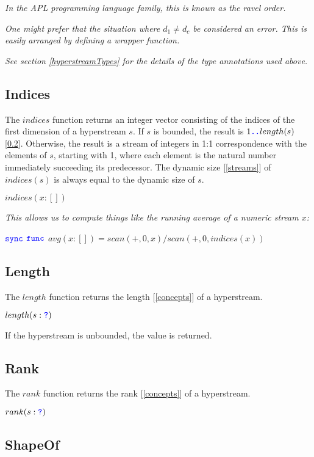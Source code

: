 \documentclass{article}
\begin{document}
{\em In the APL programming language family, this is known as the ravel order.}

{\em
One might prefer that the situation where $d_1 \ne d_c$ be considered an error.  This is easily arranged by defining a wrapper function.
}

{\em
See section \ref{hyperstreamTypes} for the details of the type annotations used above.
}

\subsection{Indices}
\label{indices}

The $indices$ function returns an integer vector consisting of the indices of the first dimension of a hyperstream $s$. If $s$ is bounded, the result is $1 \texttt{\color{blue} ..}{} length(s)$ [\ref{length}].  Otherwise, the result is a stream of integers in 1:1 correspondence with the elements of $s$, starting with 1, where each element is the natural number immediately succeeding its predecessor. The dynamic size [\ref{streams}] of $indices(s)$ is always equal to the dynamic size of $s$.

$indices(x: [])$

{\em
This allows us to compute things like the running average of a numeric stream $x$:

$\texttt{\color{blue} sync}{}$  $\texttt{\color{blue} func}{}$ $avg(x:[]) = scan(+, 0, x)/scan(+, 0, indices(x))$
}

\subsection{Length}
\label{length}

The $length$ function returns the length [\ref{concepts}] of a hyperstream.

$length(s: \texttt{\color{blue} ?}{})$

If the hyperstream is unbounded, the value \QUESTIONMARK{} is returned.

\subsection{Rank}
\label{rank}

The $rank$ function returns the rank [\ref{concepts}] of a hyperstream.

$rank(s: \texttt{\color{blue} ?}{})$

\subsection{ShapeOf}
\label{shapeOf}
\end{document}
